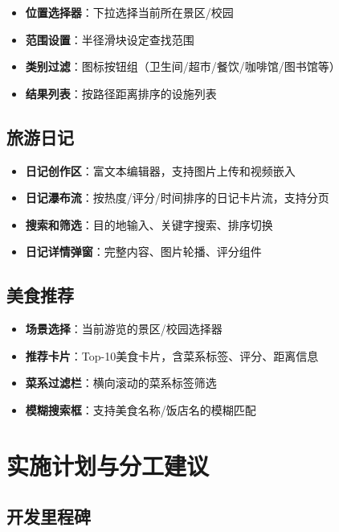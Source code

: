 \documentclass[12pt,a4paper]{report}
\begin{document}
\begin{itemize}
    \item \textbf{位置选择器}：下拉选择当前所在景区/校园
    \item \textbf{范围设置}：半径滑块设定查找范围
    \item \textbf{类别过滤}：图标按钮组（卫生间/超市/餐饮/咖啡馆/图书馆等）
    \item \textbf{结果列表}：按路径距离排序的设施列表
\end{itemize}

\section{旅游日记}

\begin{itemize}
    \item \textbf{日记创作区}：富文本编辑器，支持图片上传和视频嵌入
    \item \textbf{日记瀑布流}：按热度/评分/时间排序的日记卡片流，支持分页
    \item \textbf{搜索和筛选}：目的地输入、关键字搜索、排序切换
    \item \textbf{日记详情弹窗}：完整内容、图片轮播、评分组件
\end{itemize}

\section{美食推荐}

\begin{itemize}
    \item \textbf{场景选择}：当前游览的景区/校园选择器
    \item \textbf{推荐卡片}：Top-10美食卡片，含菜系标签、评分、距离信息
    \item \textbf{菜系过滤栏}：横向滚动的菜系标签筛选
    \item \textbf{模糊搜索框}：支持美食名称/饭店名的模糊匹配
\end{itemize}


\chapter{实施计划与分工建议}

\section{开发里程碑}
\end{document}
